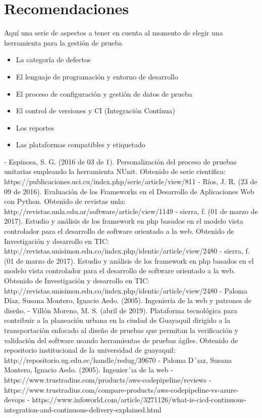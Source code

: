 \documentclass[12pt,letterpaper]{article}
\begin{document}
\section{Recomendaciones}
Aquí una serie de aspectos a tener en cuenta al momento de elegir una herramienta para la gestión de prueba
\begin{itemize}
    \item	La categoría de defectos
    \item	El lenguaje de programación y entorno de desarrollo
    \item	El proceso de configuración y gestión de datos de prueba
    \item	El control de versiones y CI (Integración Contínua)
    \item	Los reportes
    \item	Las plataformas compatibles y etiquetado

\end{itemize}

\begin{thebibliography}{XXX0000}

\bibitem - Espinosa, S. G. (2016 de 03 de 1). Personalización del proceso de pruebas unitarias empleando la herramienta NUnit. Obtenido de serie cientifica: https://publicaciones.uci.cu/index.php/serie/article/view/811
\bibitem - Ríos, J. R. (23 de 09 de 2016). Evaluación de los Frameworks en el Desarrollo de Aplicaciones Web con Python. Obtenido de revistas unla: http://revistas.unla.edu.ar/software/article/view/1149
\bibitem - sierra, f. (01 de marzo de 2017). Estudio y análisis de los framework en php basados en el modelo vista controlador para el desarrollo de software orientado a la web. Obtenido de Investigación y desarrollo en TIC: http://revistas.unisimon.edu.co/index.php/identic/article/view/2480
\bibitem - sierra, f. (01 de marzo de 2017). Estudio y análisis de los framework en php basados en el modelo vista controlador para el desarrollo de software orientado a la web. Obtenido de Investigación y desarrollo en TIC: http://revistas.unisimon.edu.co/index.php/identic/article/view/2480 
\bibitem - Paloma Díaz, Susana Montero, Ignacio Aedo. (2005). Ingeniería de la web y patrones de diseño.
\bibitem - Villón Moreno, M. S. (abril de 2019). Plataforma tecnológica para contribuir a la planeación urbana en la ciudad de Guayaquil dirigido a la transportación enfocado al diseño de pruebas que permitan la verificación y validación del software usando herramientas de pruebas ágiles. Obtenido de repositorio institucional de la universidad de guayaquil: http://repositorio.ug.edu.ec/handle/redug/39670
\bibitem - Paloma D´ıaz, Susana Montero, Ignacio Aedo. (2005). Ingenier´ıa de la web
\bibitem - https://www.trustradius.com/products/aws-codepipeline/reviews
\bibitem - https://www.trustradius.com/compare-products/aws-codepipeline-vs-azure-devops
\bibitem - https://www.infoworld.com/article/3271126/what-is-cicd-continuous-integration-and-continuous-delivery-explained.html

\end{thebibliography}
\end{document}
